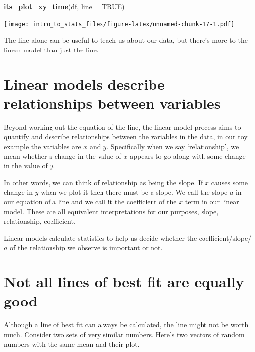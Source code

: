 \documentclass[
]{book}
\newenvironment{Shaded}{\begin{snugshade}}{\end{snugshade}}
\newcommand{\DataTypeTok}[1]{\textcolor[rgb]{0.13,0.29,0.53}{#1}}
\newcommand{\KeywordTok}[1]{\textcolor[rgb]{0.13,0.29,0.53}{\textbf{#1}}}
\newcommand{\NormalTok}[1]{#1}
\newcommand{\OtherTok}[1]{\textcolor[rgb]{0.56,0.35,0.01}{#1}}
\begin{document}
\begin{Shaded}
\begin{Highlighting}[]
\KeywordTok{its_plot_xy_time}\NormalTok{(df, }\DataTypeTok{line =} \OtherTok{TRUE}\NormalTok{)}
\end{Highlighting}
\end{Shaded}

\texttt{[image: intro\_to\_stats\_files/figure-latex/unnamed-chunk-17-1.pdf]}

The line alone can be useful to teach us about our data, but there's more to the linear model than just the line.

\hypertarget{linear-models-describe-relationships-between-variables}{%
\section{Linear models describe relationships between variables}\label{linear-models-describe-relationships-between-variables}}

Beyond working out the equation of the line, the linear model process aims to quantify and describe relationships between the variables in the data, in our toy example the variables are \(x\) and \(y\). Specifically when we say `relationship', we mean whether a change in the value of \(x\) appears to go along with some change in the value of \(y\).

In other words, we can think of relationship as being the slope. If \(x\) causes some change in \(y\) when we plot it then there must be a slope. We call the slope \(a\) in our equation of a line and we call it the coefficient of the \(x\) term in our linear model. These are all equivalent interpretations for our purposes, slope, relationship, coefficient.

Linear models calculate statistics to help us decide whether the coefficient/slope/\(a\) of the relationship we observe is important or not.

\hypertarget{not-all-lines-of-best-fit-are-equally-good}{%
\section{Not all lines of best fit are equally good}\label{not-all-lines-of-best-fit-are-equally-good}}

Although a line of best fit can always be calculated, the line might not be worth much. Consider two sets of very similar numbers. Here's two vectors of random numbers with the same mean and their plot.
\end{document}
